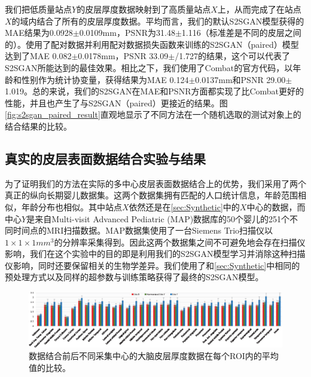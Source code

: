 我们把低质量站点$Y$的皮层厚度数据映射到了高质量站点$X$上，从而完成了在站点$X$的域内结合了所有的皮层厚度数据。平均而言，我们的默认S2SGAN模型获得的MAE结果为0.0928$\pm$0.0109mm，PSNR为31.48$\pm$1.116（标准差是不同的皮层之间的）。使用了配对数据并利用配对数据损失函数来训练的S2SGAN（paired）模型达到了MAE 0.082$\pm$0.0178mm，PSNR 33.09$\pm$/1.727的结果，这个可以代表了S2SGAN所能达到的最佳效果。相比之下，我们使用了Combat的官方代码，以年龄和性别作为统计协变量，获得结果为MAE 0.124$\pm$0.0137mm和PSNR 29.00$\pm$1.019。总的来说，我们的S2SGAN在MAE和PSNR方面都实现了比Combat更好的性能，并且也产生了与S2SGAN（paired）更接近的结果。图\ref{fig:s2sgan_paired_result}直观地显示了不同方法在一个随机选取的测试对象上的结合结果的比较。


\subsection{真实的皮层表面数据结合实验与结果}
为了证明我们的方法在实际的多中心皮层表面数据结合上的优势，我们采用了两个真正的纵向长期婴儿数据集。这两个数据集拥有匹配的人口统计信息，年龄范围相似，年龄分布也相似。其中站点$X$依然还是在\ref{sec:Synthetic}中的$X$中心的数据，而中心$Y$是来自Multi-visit Advanced Pediatric (MAP)数据库的50个婴儿的251个不同时间点的MRI扫描数据。MAP数据集使用了一台Siemens Trio扫描仪以$1\times 1\times 1mm^3$的分辨率采集得到。因此这两个数据集之间不可避免地会存在扫描仪影响，我们在这个实验中的目的即是利用我们的S2SGAN模型学习并消除这种扫描仪影响，同时还要保留相关的生物学差异。我们使用了和\ref{sec:Synthetic}中相同的预处理方式以及同样的超参数与训练策略获得了最终的S2SGAN模型。

\begin{figure}[t]
\centering
\includegraphics[width=\linewidth]{figure/s2sgan_roi_bar_realA_realB_fakeA.eps}
\caption{数据结合前后不同采集中心的大脑皮层厚度数据在每个ROI内的平均值的比较。}\label{fig:s2sgan_roi_bar_realA_realB_fakeA} 
\end{figure} 

